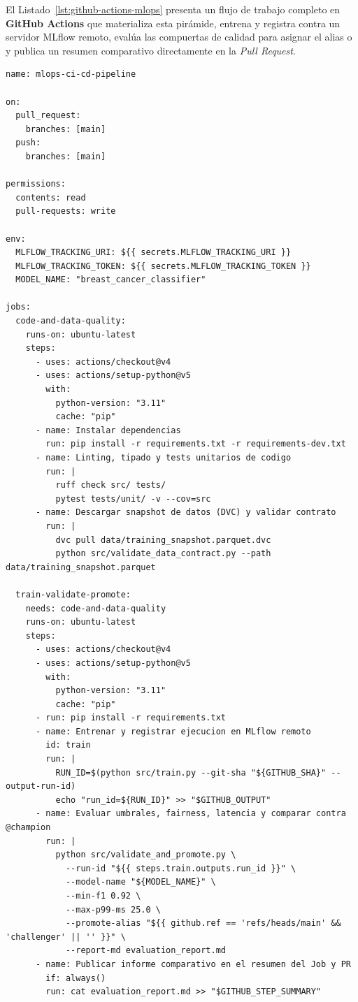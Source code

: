 El Listado~\ref{lst:github-actions-mlops} presenta un flujo de trabajo completo en \textbf{GitHub Actions} que materializa esta pirámide, entrena y registra contra un servidor MLflow remoto, evalúa las compuertas de calidad para asignar el alias  o  y publica un resumen comparativo directamente en la \textit{Pull Request}.

\begin{lstlisting}[style=yaml, caption={Workflow productivo de GitHub Actions para CI/CD de ML: pruebas de código y datos, entrenamiento en MLflow, validación challenger-vs-champion y reporte en PR.}, label={lst:github-actions-mlops}]
name: mlops-ci-cd-pipeline

on:
  pull_request:
    branches: [main]
  push:
    branches: [main]

permissions:
  contents: read
  pull-requests: write

env:
  MLFLOW_TRACKING_URI: ${{ secrets.MLFLOW_TRACKING_URI }}
  MLFLOW_TRACKING_TOKEN: ${{ secrets.MLFLOW_TRACKING_TOKEN }}
  MODEL_NAME: "breast_cancer_classifier"

jobs:
  code-and-data-quality:
    runs-on: ubuntu-latest
    steps:
      - uses: actions/checkout@v4
      - uses: actions/setup-python@v5
        with:
          python-version: "3.11"
          cache: "pip"
      - name: Instalar dependencias
        run: pip install -r requirements.txt -r requirements-dev.txt
      - name: Linting, tipado y tests unitarios de codigo
        run: |
          ruff check src/ tests/
          pytest tests/unit/ -v --cov=src
      - name: Descargar snapshot de datos (DVC) y validar contrato
        run: |
          dvc pull data/training_snapshot.parquet.dvc
          python src/validate_data_contract.py --path data/training_snapshot.parquet

  train-validate-promote:
    needs: code-and-data-quality
    runs-on: ubuntu-latest
    steps:
      - uses: actions/checkout@v4
      - uses: actions/setup-python@v5
        with:
          python-version: "3.11"
          cache: "pip"
      - run: pip install -r requirements.txt
      - name: Entrenar y registrar ejecucion en MLflow remoto
        id: train
        run: |
          RUN_ID=$(python src/train.py --git-sha "${GITHUB_SHA}" --output-run-id)
          echo "run_id=${RUN_ID}" >> "$GITHUB_OUTPUT"
      - name: Evaluar umbrales, fairness, latencia y comparar contra @champion
        run: |
          python src/validate_and_promote.py \
            --run-id "${{ steps.train.outputs.run_id }}" \
            --model-name "${MODEL_NAME}" \
            --min-f1 0.92 \
            --max-p99-ms 25.0 \
            --promote-alias "${{ github.ref == 'refs/heads/main' && 'challenger' || '' }}" \
            --report-md evaluation_report.md
      - name: Publicar informe comparativo en el resumen del Job y PR
        if: always()
        run: cat evaluation_report.md >> "$GITHUB_STEP_SUMMARY"
\end{lstlisting}

